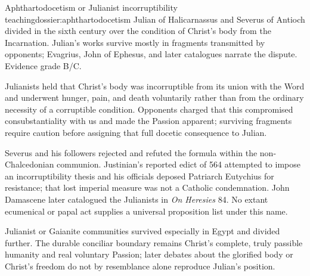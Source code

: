 \begin{heresydossier}{Aphthartodocetism or Julianist incorruptibility teaching}{dossier:aphthartodocetism}
\objectfield Julian of Halicarnassus and Severus of Antioch divided in the sixth century over the condition of Christ's body from the Incarnation. Julian's works survive mostly in fragments transmitted by opponents; Evagrius, John of Ephesus, and later catalogues narrate the dispute. Evidence grade B/C.

\propositionfield Julianists held that Christ's body was incorruptible from its union with the Word and underwent hunger, pain, and death voluntarily rather than from the ordinary necessity of a corruptible condition. Opponents charged that this compromised consubstantiality with us and made the Passion apparent; surviving fragments require caution before assigning that full docetic consequence to Julian.

\responsefield Severus and his followers rejected and refuted the formula within the non-Chalcedonian communion. Justinian's reported edict of 564 attempted to impose an incorruptibility thesis and his officials deposed Patriarch Eutychius for resistance; that lost imperial measure was not a Catholic condemnation. John Damascene later catalogued the Julianists in \emph{On Heresies} 84. No extant ecumenical or papal act supplies a universal proposition list under this name.

\aftermathfield Julianist or Gaianite communities survived especially in Egypt and divided further. The durable conciliar boundary remains Christ's complete, truly passible humanity and real voluntary Passion; later debates about the glorified body or Christ's freedom do not by resemblance alone reproduce Julian's position.
\end{heresydossier}

